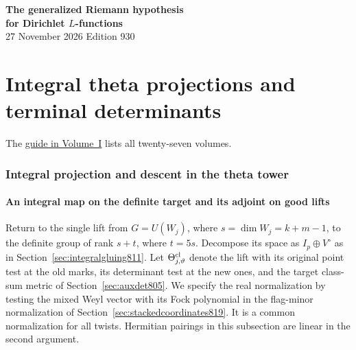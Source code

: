 \documentclass[a4paper,11pt]{article}
\theoremstyle{definition}
\theoremstyle{remark}
\numberwithin{equation}{section}
\begin{document}
\setcounter{part}{15}
\thispagestyle{plain}\begin{center}
{\LARGE\bfseries The generalized Riemann hypothesis\\[2pt]for Dirichlet \(L\)-functions}\\[6pt]
{\small 27 November 2026 \quad\textperiodcentered\quad Edition 930}\end{center}
\part{Integral theta projections and terminal determinants}\label{part:XVI}
\begin{abstract}\noindent We descend the integral projection through the theta tower, evaluate the critical torus tests and study the terminal coefficient lattices. Finite valuations and archimedean norms give separate bounds on the same projected determinants.\end{abstract}
\setcounter{section}{80}
\noindent The \hyperref[seriesguide]{guide in Volume~I} lists all twenty-seven volumes.
\begingroup\small\setlength{\parskip}{0pt}\tableofcontents\endgroup
\clearpage

\section{Integral projection and descent in the theta tower}\label{nav:theta-descent}\label{nav:volume-XVI}

\subsection{An integral map on the definite target and its adjoint on good lifts}
\label{sec:gluedperiodmap844}
Return to the single lift from \(G=U(W_j)\), where \(s=\dim W_j=k+m-1\),
to the definite group of rank \(s+t\), where \(t=5s\). Decompose its
space as \(I_p\oplus V^\circ\) as in Section~\ref{sec:integralgluing811}.
Let \(\Theta_{j,\vartheta}^{\rm cl}\) denote the lift with its original
point test at the old marks, its determinant test at the new ones,
and the target class-sum metric of Section~\ref{sec:auxdet805}.
We specify the real normalization by testing the mixed Weyl vector
with its Fock polynomial in the flag-minor normalization of
Section~\ref{sec:stackedcoordinates819}. It is a common normalization
for all twists. Hermitian pairings in this subsection are linear in
the second argument.
\end{document}
